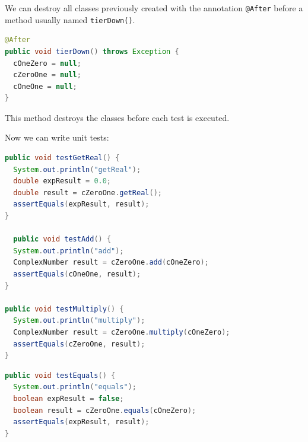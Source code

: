 \documentclass[11pt, xcolor=svgnames]{beamer}
\begin{document}

\begin{frame}[fragile]

We can destroy all classes previously created with the annotation  \texttt{@After} before a method usually named \texttt{tierDown()}.

\begin{lstlisting}[language=Java,basicstyle=\tiny]
@After
public void tierDown() throws Exception {
  cOneZero = null;
  cZeroOne = null;
  cOneOne = null;
}
\end{lstlisting}

This method destroys the classes before each test is executed.

\end{frame}


\begin{frame}[fragile]
Now we can write unit tests:

\begin{lstlisting}[language=Java,basicstyle=\tiny]
public void testGetReal() {
  System.out.println("getReal");
  double expResult = 0.0;
  double result = cZeroOne.getReal();
  assertEquals(expResult, result);
}

  public void testAdd() {
  System.out.println("add");
  ComplexNumber result = cZeroOne.add(cOneZero);
  assertEquals(cOneOne, result);
}

public void testMultiply() {
  System.out.println("multiply");
  ComplexNumber result = cZeroOne.multiply(cOneZero);
  assertEquals(cZeroOne, result);
}
\end{lstlisting}
\end{frame}

\begin{frame}[fragile]

\begin{lstlisting}[language=Java,basicstyle=\tiny]
public void testEquals() {
  System.out.println("equals");
  boolean expResult = false;
  boolean result = cZeroOne.equals(cOneZero);
  assertEquals(expResult, result);
}
\end{lstlisting}



\end{frame}
\end{document}
